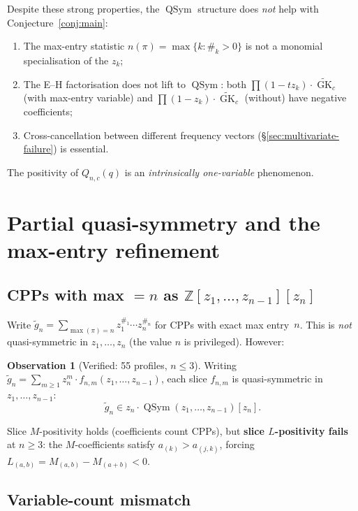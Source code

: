 \documentclass[11pt]{article}
\theoremstyle{plain}
\theoremstyle{definition}
\newtheorem{observation}[theorem]{Observation}
\theoremstyle{remark}
\newcommand{\Z}{\mathbb{Z}}
\newcommand{\GK}{\operatorname{GK}}
\newcommand{\QSym}{\operatorname{QSym}}
\begin{document}
Despite these strong properties, the $\QSym$ structure does
\emph{not} help with Conjecture~\ref{conj:main}:
\begin{enumerate}
  \item The max-entry statistic $n(\pi) = \max\{k : \#_k > 0\}$
    is not a monomial specialisation of the $z_k$;
  \item The E--H factorisation does not lift to $\QSym$: both
    $\prod(1 - tz_k) \cdot \widetilde{\GK}_c$ (with max-entry
    variable) and $\prod(1 - z_k) \cdot \widetilde{\GK}_c$
    (without) have negative coefficients;
  \item Cross-cancellation between different frequency vectors
    (\S\ref{sec:multivariate-failure}) is essential.
\end{enumerate}

The positivity of $Q_{n,c}(q)$ is an \emph{intrinsically
one-variable} phenomenon.


\section{Partial quasi-symmetry and the max-entry refinement}
\label{sec:partial}

\subsection{CPPs with max $= n$ as $\Z[z_1,\ldots,z_{n-1}][z_n]$}

Write $\tilde{g}_n = \sum_{\max(\pi)=n} z_1^{\#_1} \cdots z_n^{\#_n}$
for CPPs with exact max entry~$n$. This is \emph{not}
quasi-symmetric in $z_1, \ldots, z_n$ (the value $n$ is privileged).
However:

\begin{observation}[Verified: 55 profiles, $n \leq 3$]
\label{obs:partial}
Writing $\tilde{g}_n = \sum_{m \geq 1} z_n^m \cdot
f_{n,m}(z_1, \ldots, z_{n-1})$, each slice $f_{n,m}$ is
quasi-symmetric in $z_1, \ldots, z_{n-1}$:
\[
  \tilde{g}_n \in z_n \cdot \QSym(z_1, \ldots, z_{n-1})[z_n].
\]
\end{observation}

Slice $M$-positivity holds (coefficients count CPPs), but
\textbf{slice $L$-positivity fails} at $n \geq 3$: the
$M$-coefficients satisfy $a_{(k)} > a_{(j,k)}$, forcing
$L_{(a,b)} = M_{(a,b)} - M_{(a+b)} < 0$.

\subsection{Variable-count mismatch}
\end{document}
